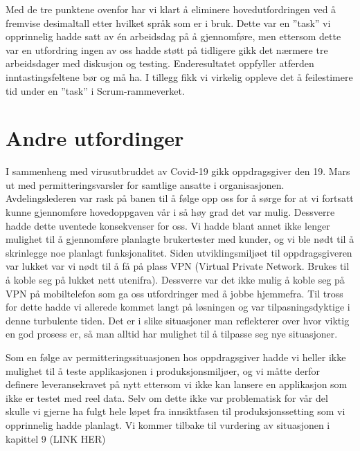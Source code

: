 Med de tre punktene ovenfor har vi klart å eliminere hovedutfordringen ved å fremvise desimaltall etter hvilket språk som er i bruk. Dette var en ''task'' vi opprinnelig hadde satt av én arbeidsdag på å gjennomføre, men ettersom dette var en utfordring ingen av oss hadde støtt på tidligere gikk det nærmere tre arbeidsdager med diskusjon og testing. Enderesultatet oppfyller atferden inntastingsfeltene bør og må ha. I tillegg fikk vi  virkelig oppleve det å feilestimere tid under en ''task'' i Scrum-rammeverket. 


\section{\textbf{Andre utfordinger}}

I sammenheng med virusutbruddet av Covid-19 gikk oppdragsgiver den 19. Mars ut med permitteringsvarsler for samtlige ansatte i organisasjonen. Avdelingslederen var rask på banen til å følge opp oss for å sørge for at vi fortsatt kunne gjennomføre hovedoppgaven vår i så høy grad det var mulig. Dessverre hadde dette uventede konsekvenser for oss. Vi hadde blant annet ikke lenger mulighet til å gjennomføre planlagte brukertester med kunder, og vi ble nødt til å skrinlegge noe planlagt funksjonalitet. Siden utviklingsmiljøet til oppdragsgiveren var lukket var vi nødt til å få på plass VPN (Virtual Private Network. Brukes til å koble seg på lukket nett utenifra). Dessverre var det ikke mulig å koble seg på VPN på mobiltelefon som ga oss utfordringer med å jobbe hjemmefra. Til tross for dette hadde vi allerede kommet langt på løsningen og var tilpasningsdyktige i denne turbulente tiden. Det er i slike situasjoner man reflekterer over hvor viktig en god prosess er, så man alltid har mulighet til å tilpasse seg nye situasjoner.

Som en følge av permitteringssituasjonen hos oppdragsgiver hadde vi heller ikke mulighet til å teste applikasjonen i produksjonsmiljøer, og vi måtte derfor definere leveransekravet på nytt ettersom vi ikke kan lansere en applikasjon som ikke er testet med reel data. Selv om dette ikke var problematisk for vår del skulle vi gjerne ha fulgt hele løpet fra innsiktfasen til produksjonssetting som vi opprinnelig hadde planlagt. Vi kommer tilbake til vurdering av situasjonen i kapittel 9 (LINK HER)

